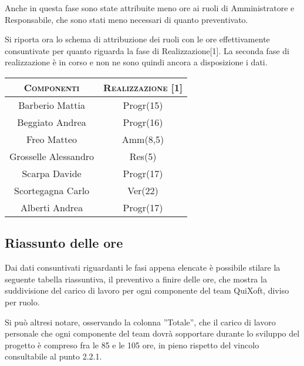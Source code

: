 \documentclass[11pt,a4paper]{article}
\begin{document}
Anche in questa fase sono state attribuite meno ore ai ruoli di Amministratore e Responsabile, che sono stati meno necessari di quanto preventivato.

Si riporta ora lo schema di attribuzione dei ruoli con le ore effettivamente consuntivate per quanto riguarda la fase di Realizzazione[1]. La seconda fase di realizzazione è in corso e non ne sono quindi ancora a disposizione i dati.
\\
\begin{center}
\begin{tabular}{|c||c|}
\hline
\textsc{Componenti} & \textsc{Realizzazione [1]} \\ \hline \hline
Barberio Mattia & Progr(15) \\ \hline
Beggiato Andrea & Progr(16) \\ \hline
Freo Matteo & Amm(8,5) \\ \hline
Grosselle Alessandro & Res(5) \\ \hline
Scarpa Davide & Progr(17) \\ \hline
Scortegagna Carlo & Ver(22) \\ \hline
Alberti Andrea & Progr(17) \\ \hline
\end{tabular}
\end{center}
\bigskip
\subsection{Riassunto delle ore}
Dai dati consuntivati riguardanti le fasi appena elencate è possibile stilare la seguente tabella riassuntiva, il preventivo a finire delle ore, che mostra la suddivisione del carico di lavoro per ogni componente del team QuiXoft, diviso per ruolo.

Si può altresi notare, osservando la colonna ''Totale'', che il carico di lavoro personale che ogni componente del team dovrà sopportare durante lo sviluppo del progetto è compreso fra le 85 e le 105 ore, in pieno rispetto del vincolo consultabile al punto 2.2.1.
\end{document}
